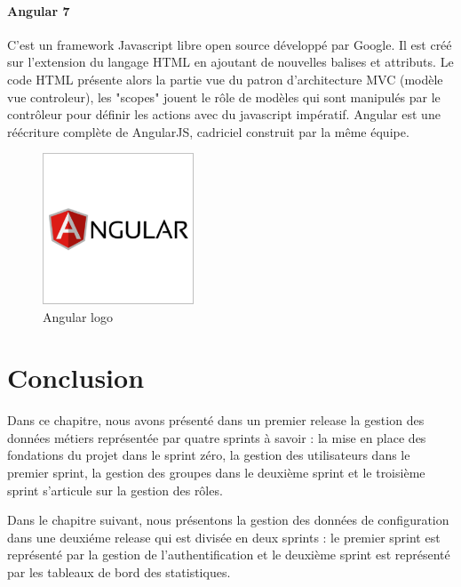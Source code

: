 \paragraph{Angular 7}
C'est un framework Javascript libre open source d\'evelopp\'e par Google. Il est cr\'e\'e sur l'extension du langage HTML en ajoutant de nouvelles balises et attributs. Le code HTML pr\'esente  alors la partie vue du patron d'architecture MVC (mod\`ele vue controleur), les "scopes" jouent le r\^ole de mod\`eles qui sont manipul\'es par le contrôleur pour d\'efinir les actions avec du javascript imp\'eratif. Angular est une r\'e\'ecriture compl\`ete de AngularJS, cadriciel construit par la m\^eme \'equipe.
\begin{figure}[!ht]\centering
\includegraphics[width=0.4\textwidth]{chapitres/chapitrex/figures/angular.png}
\caption{Angular logo }
\label{fig:angular}
\end{figure}




\section*{Conclusion}
Dans ce chapitre, nous avons pr\'esent\'e dans un premier release la gestion des donn\'ees m\'etiers repr\'esent\'ee par quatre sprints \`a savoir : la mise en place des fondations du projet dans le sprint z\'ero, la gestion des utilisateurs dans le premier sprint, la gestion des groupes dans le deuxi\`eme sprint et le troisi\`eme sprint s'articule sur la gestion des r\^oles.

Dans le chapitre suivant, nous pr\'esentons la gestion des donn\'ees de configuration dans une deuxi\'eme release qui est divis\'ee en deux sprints : le premier sprint est repr\'esent\'e par la gestion de l'authentification et le deuxi\`eme sprint est repr\'esent\'e par les tableaux de bord des statistiques.